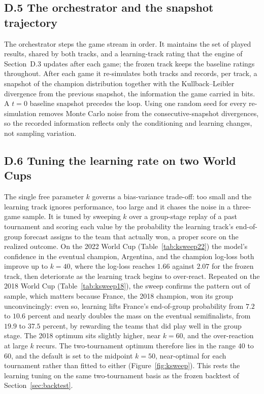 \documentclass[11pt,letterpaper]{article}
\begin{document}
\subsection*{D.5 \quad The orchestrator and the snapshot trajectory}

The orchestrator steps the game stream in order. It maintains the set of played results, shared by both tracks, and a learning-track rating that the engine of Section~D.3 updates after each game; the frozen track keeps the baseline ratings throughout. After each game it re-simulates both tracks and records, per track, a snapshot of the champion distribution together with the Kullback--Leibler divergence from the previous snapshot, the information the game carried in bits. A $t=0$ baseline snapshot precedes the loop. Using one random seed for every re-simulation removes Monte Carlo noise from the consecutive-snapshot divergences, so the recorded information reflects only the conditioning and learning changes, not sampling variation.

\subsection*{D.6 \quad Tuning the learning rate on two World Cups}

The single free parameter $k$ governs a bias-variance trade-off: too small and the learning track ignores performance, too large and it chases the noise in a three-game sample. It is tuned by sweeping $k$ over a group-stage replay of a past tournament and scoring each value by the probability the learning track's end-of-group forecast assigns to the team that actually won, a proper score on the realized outcome. On the 2022 World Cup (Table~\ref{tab:ksweep22}) the model's confidence in the eventual champion, Argentina, and the champion log-loss both improve up to $k=40$, where the log-loss reaches $1.66$ against $2.07$ for the frozen track, then deteriorate as the learning track begins to over-react. Repeated on the 2018 World Cup (Table~\ref{tab:ksweep18}), the sweep confirms the pattern out of sample, which matters because France, the 2018 champion, won its group unconvincingly: even so, learning lifts France's end-of-group probability from $7.2$ to $10.6$ percent and nearly doubles the mass on the eventual semifinalists, from $19.9$ to $37.5$ percent, by rewarding the teams that did play well in the group stage. The 2018 optimum sits slightly higher, near $k=60$, and the over-reaction at large $k$ recurs. The two-tournament optimum therefore lies in the range $40$ to $60$, and the default is set to the midpoint $k=50$, near-optimal for each tournament rather than fitted to either (Figure~\ref{fig:ksweep}). This rests the learning tuning on the same two-tournament basis as the frozen backtest of Section~\ref{sec:backtest}.
\end{document}
